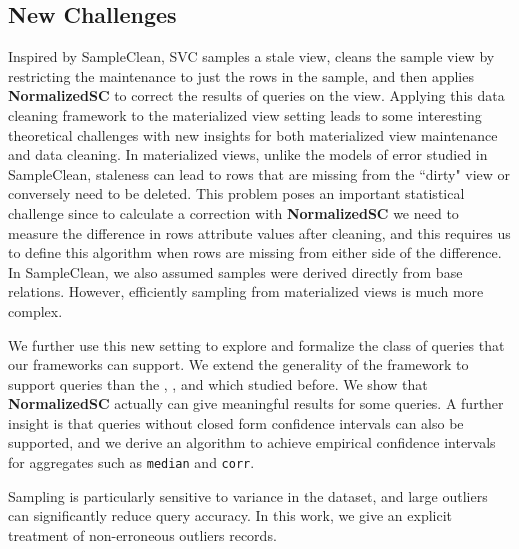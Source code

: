 \subsection{New Challenges}
Inspired by SampleClean, SVC samples a stale view, cleans the sample view by restricting the maintenance to just the rows in the sample, and then applies \textbf{NormalizedSC} to correct the results of queries on the view.
Applying this data cleaning framework to the materialized view setting leads to some interesting theoretical challenges with new insights for both materialized view maintenance and data cleaning.
In materialized views, unlike the models of error studied in SampleClean, staleness can lead to rows that are missing from the ``dirty" view or conversely need to be deleted.
This problem poses an important statistical challenge since to calculate a correction with \textbf{NormalizedSC} we need to measure the difference in rows attribute values after cleaning, and this requires us to define this algorithm when rows are missing from either side of the difference.
In SampleClean, we also assumed samples were derived directly from base relations.
However, efficiently sampling from materialized views is much more complex.

We further use this new setting to explore and formalize the class of queries that our frameworks can support.
We extend the generality of the framework to support queries than the \sumfunc, \avgfunc, and \countfunc which studied before.
We show that \textbf{NormalizedSC} actually can give meaningful results for some \selectfunc queries.
A further insight is that queries without closed form confidence intervals can also be supported, and we
derive an algorithm to achieve empirical confidence intervals for aggregates such as \texttt{median} and \texttt{corr}.

Sampling is particularly sensitive to variance in the dataset, and large outliers can significantly reduce query accuracy.
In this work, we give an explicit treatment of non-erroneous outliers records.




